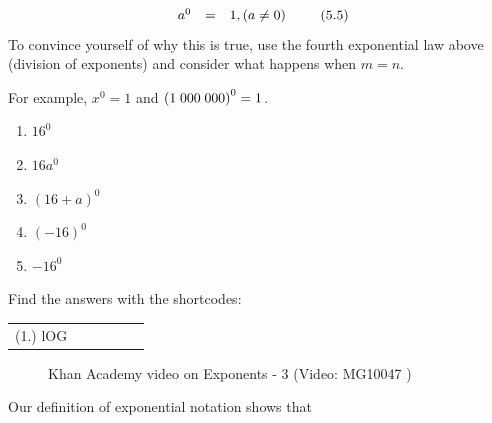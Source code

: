     \begin{equation}
    \begin{array}{ccc}\hfill {a}^{0}& =& 1,\left(a\ne 0\right)\hfill \end{array}\tag{5.5}
      \end{equation}
        \label{m38359*eip-662}To convince yourself of why this is true, use the fourth exponential law above (division of exponents) and consider what happens when $m=n$.\par \label{m38359*id63571}For example, ${x}^{0}=1$ and ${\left(1\phantom{\rule{0.277778em}{0ex}}000\phantom{\rule{0.277778em}{0ex}}000\right)}^{0}=1$.\par 
\label{m38359*secfhsst!!!underscore!!!id339}
            \nopagebreak
        \label{m38359*id63666}\begin{enumerate}[noitemsep, label=\textbf{\arabic*}. ] 
            \label{m38359*uid6}\item 
            ${16}^{0}$
      \label{m38359*uid7}\item 
        $16{a}^{0}$
      \label{m38359*uid8}\item 
        ${\left(16+a\right)}^{0}$
      \label{m38359*uid9}\item 
        ${\left(-16\right)}^{0}$
      \label{m38359*uid10}\item 
        $-{16}^{0}$ 
\newline
\newline
          \end{enumerate}
      \label{m38359*uid11}
\par {} Find the answers with the shortcodes:
 \par \begin{tabular}[h]{cccccc}
 (1.) lOG  & \end{tabular}
            \nopagebreak
        \label{m38359*eip-427}
    \setcounter{subfigure}{0}
	\begin{figure}[H] %
    \textnormal{Khan Academy video on Exponents - 3}\vspace{.1in} \nopagebreak
  \label{m38359*yt-media3}\label{m38359*yt-video3}
             { (Video:  MG10047 )}
      \vspace{2pt}
    \vspace{.1in}
 \end{figure}       \par \label{m38359*id63888}Our definition of exponential notation shows that\par 
